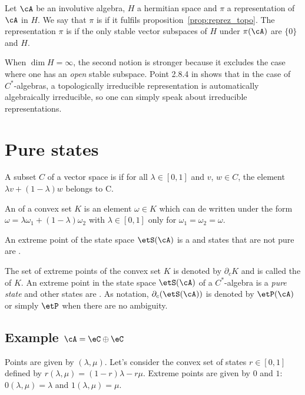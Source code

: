 \begin{definition}
	Let $\cA$ be an involutive algebra, $H$ a hermitian space and $\pi$ a representation of $\cA$ in $H$. We say that $\pi$ is  if it fulfils proposition~\ref{prop:reprez_topo}. The representation $\pi$ is  if the only stable vector subspaces of $H$ under $\pi(\cA)$ are $\{0\}$ and $H$.
\end{definition}

When $\dim H=\infty$, the second notion is stronger because it excludes the case where one has an \emph{open} stable subspace. Point 2.8.4 in \cite{Dixmier} shows that in the case of $C^*$-algebras, a topologically irreducible representation is automatically algebraically irreducible, so one can simply speak about irreducible representations.

%
\section{Pure states}
%


A subset $C$ of a vector space is  if for all $\lambda\in[0,1]$ and $v$, $w\in C$, the element $\lambda v+(1-\lambda)w$ belongs to C.

An  of a convex set $K$ is an element $\omega\in K$ which can de written under the form $\omega=\lambda\omega_1+(1-\lambda)\omega_2$ with $\lambda\in[0,1]$ only for $\omega_1=\omega_2=\omega$.

\begin{definition}
	An extreme point of the state space $\etS(\cA)$ is a  and states that are not pure are .
\end{definition}

The set of extreme points of the convex set $K$ is denoted by $\partial_cK$ and is called the  of $K$.  An extreme point in the state space $\etS(\cA)$ of a $C^*$-algebra is a \emph{pure state} and other states are . As notation, $\partial_c(\etS(\cA))$ is denoted by $\etP(\cA)$ or simply $\etP$ when there are no ambiguity.

\subsection*{Example \texorpdfstring{$\cA=\eC\oplus\eC$}{A=C+C}}
Points are given by $(\lambda,\mu)$. Let's consider the convex set of states $r\in[0,1]$ defined by $r(\lambda,\mu)=(1-r)\lambda-r\mu$.  Extreme points are given by $0$ and $1$: $0(\lambda, \mu)=\lambda$ and $1(\lambda,\mu)=\mu$.

